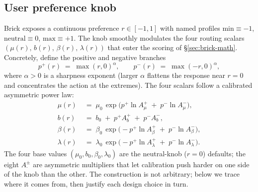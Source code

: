 \documentclass[twocolumn,10pt,a4paper]{article}
\begin{document}
\subsection{User preference knob}\label{sec:brick-knob}
Brick exposes a continuous preference $r\in[-1,1]$ with named profiles $\mathrm{min}{\equiv}{-1}$, $\mathrm{neutral}{\equiv}0$, $\mathrm{max}{\equiv}{+1}$. The knob smoothly modulates the four routing scalars $(\mu(r),\,b(r),\,\beta(r),\,\lambda(r))$ that enter the scoring of §\ref{sec:brick-math}. Concretely, define the positive and negative branches
\[
  p^{+}(r) \;=\; \max(r,0)^{\alpha}, \qquad p^{-}(r) \;=\; \max(-r,0)^{\alpha},
\]
where $\alpha{>}0$ is a sharpness exponent (larger $\alpha$ flattens the response near $r{=}0$ and concentrates the action at the extremes). The four scalars follow a calibrated asymmetric power law:
\[
\begin{aligned}
  \mu(r)     &\;=\; \mu_0\,\exp\!\bigl(p^{+}\ln A_{\mu}^{+} \;+\; p^{-}\ln A_{\mu}^{-}\bigr), \\
  b(r)       &\;=\; b_0 \;+\; p^{+}A_{b}^{+} \;+\; p^{-}A_{b}^{-}, \\
  \beta(r)   &\;=\; \beta_0\,\exp\!\bigl(-p^{+}\ln A_{\beta}^{+} \;+\; p^{-}\ln A_{\beta}^{-}\bigr), \\
  \lambda(r) &\;=\; \lambda_0\,\exp\!\bigl(-p^{+}\ln A_{\lambda}^{+} \;+\; p^{-}\ln A_{\lambda}^{-}\bigr).
\end{aligned}
\]
The four base values $(\mu_0, b_0, \beta_0, \lambda_0)$ are the neutral-knob ($r{=}0$) defaults; the eight $A_{\cdot}^{\pm}$ are asymmetric multipliers that let calibration push harder on one side of the knob than the other. The construction is not arbitrary; below we trace where it comes from, then justify each design choice in turn.
\end{document}
